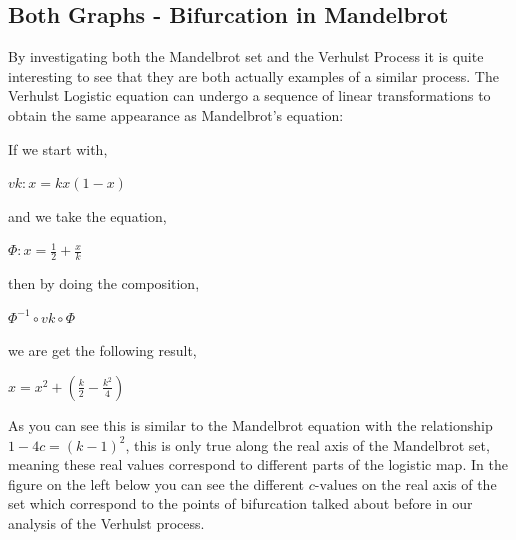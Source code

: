 \documentclass[a4wide, 10pt]{article}
\begin{document}
\subsection{Both Graphs - Bifurcation in Mandelbrot}
By investigating both the Mandelbrot set and the Verhulst Process
 it is quite interesting to see that they are both actually
  examples of a similar process. The Verhulst Logistic equation
   can undergo a sequence of linear transformations to obtain the
    same appearance as Mandelbrot's equation:

If we start with,
  \begin{center}
  $vk : x = kx(1-x)$
  \end{center}
and we take the equation,
  \begin{center}
  $ \Phi : x = \frac{1}{2} + \frac{x}{k} $
  \end{center}
then by doing the composition, 
  \begin{center}
  $ \Phi^{-1 }\circ vk \circ \Phi $
  \end{center}
we are get the following result,
  \begin{center}
  $ x = x^2 + (\frac{k}{2} - \frac{k^2}{4}) $
  \end{center}
  
As you can see this is similar to the Mandelbrot equation with
 the relationship $1-4c = (k-1)^2$\cite{Bifurcation in Mandelbrot Set 2}, this is only true along the
  real axis of the Mandelbrot set, meaning these real values
   correspond to different parts of the logistic map. In the figure 
    on the left below you can see the different $c \textrm{-values}$
     on the real axis of the set which correspond to the points of
      bifurcation talked about before in our analysis of the Verhulst
       process. 
   
\end{document}
